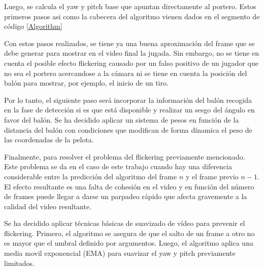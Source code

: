 Luego, se calcula el yaw y pitch base que apuntan directamente al portero. Estos primeros pasos asi como la cabecera del algoritmo vienen dados en el segmento de código \ref{Algorithm}


Con estos pasos realizados, se tiene ya una buena aproximación del frame que se debe generar para mostrar en el video final la jugada. Sin embargo, no se tiene en cuenta el posible efecto flickering causado por un falso positivo de un jugador que no sea el portero acercandose a la cámara ni se tiene en cuenta la posición del balón para mostrar, por ejemplo, el inicio de un tiro.

Por lo tanto, el siguiente paso será incorporar la información del balón recogida en la fase de detección si es que está disponible y realizar un sesgo del ángulo en favor del balón. Se ha decidido aplicar un sistema de pesos en función de la distancia del balón con condiciones que modifican de forma dínamica el peso de las coordenadas de la pelota.



Finalmente, para resolver el problema del flickering previamente mencionado. Este problema se da en el caso de este trabajo cuando hay una diferencia considerable entre la predicción del algoritmo del frame $n$ y el frame previo $n-1$. El efecto resultante es una falta de cohesión en el video y en función del número de frames puede llegar a darse un parpadeo rápido que afecta gravemente a la calidad del video resultante. 

Se ha decidido aplicar técnicas básicas de suavizado de vídeo para prevenir el flickering. Primero, el algoritmo se asegura de que el salto de un frame a otro no es mayor que el umbral definido por argumentos. Luego, el algoritmo aplica una media movil exponencial (EMA) para suavizar el yaw y pitch previamente limitados.

